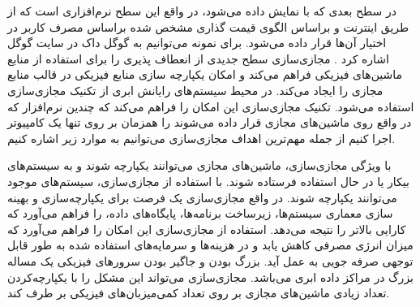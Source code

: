  در سطح بعدی که با 
 نمایش داده می‌شود، در واقع این سطح نرم‌افزاری است که از طریق اینترنت و براساس الگوی قیمت گذاری مشخص شده براساس مصرف کاربر در اختیار آن‌ها قرار داده می‌شود. برای نمونه می‌توانیم به گوگل داک در سایت گوگل اشاره کرد
  \cite{num3,num4}.
مجازی‌سازی سطح جدیدی از انعطاف پذیری را برای استفاده از منابع ماشین‌های فیزیکی
 فراهم می‌کند و امکان یکپارچه سازی منابع فیزیکی   در قالب منابع مجازی  را ایجاد می‌کند. در محیط سیستم‌های رایانش ابری از تکنیک مجازی‌سازی استفاده می‌شود. تکنیک مجازی‌سازی این امکان را فراهم می‌کند که چندین نرم‌افزار که در واقع روی ماشین‌های مجازی
 قرار داده می‌شوند را همزمان بر روی تنها یک کامپیوتر اجرا کنیم از جمله مهم‌ترین اهداف مجازی‌سازی می‌توانیم به موارد زیر اشاره کنیم.

با ویژگی مجازی‌سازی، ماشین‌های مجازی می‌توانند یکپارچه شوند و به سیستم‌های بیکار یا در حال استفاده فرستاده شوند. با استفاده از مجازی‌سازی، سیستم‌های موجود می‌توانند یکپارچه شوند. در واقع مجازی‌سازی یک فرصت برای یکپارچه‌سازی و بهینه سازی معماری سیستم‌ها، زیرساخت برنامه‌ها، پایگاه‌های داده، را فراهم می‌آورد که کارایی بالاتر را نتیجه می‌دهد.
 استفاده از مجازی‌سازی این امکان را فراهم می‌آورد که میزان انرژی مصرفی کاهش یابد و در هزینه‌ها و سرمایه‌های استفاده شده به طور قابل توجهی صرفه جویی به عمل آید.
  بزرگ بودن و جاگیر بودن سرورهای فیزیکی یک مساله بزرگ در مراکز داده ابری می‌باشد. مجازی‌سازی می‌تواند این مشکل را با یکپارچه‌کردن تعداد زیادی ماشین‌های مجازی بر روی تعداد کمی‌میزبان‌های فیزیکی بر طرف کند.
  
